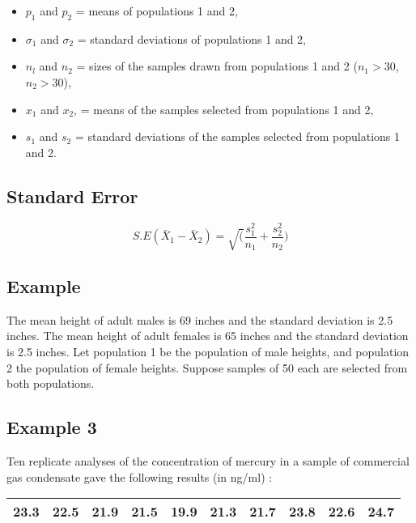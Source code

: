 \documentclass[14pt, a4paper]{article}
\theoremstyle{plain}
\theoremstyle{definition}
\theoremstyle{remark}
\begin{document}
\begin{itemize}
\item $p_1$ and $p_2$ = means of populations 1 and 2,

\item $\sigma_1$ and $\sigma_2$ = standard deviations of
populations 1 and 2,

\item $n_l$ and $n_2$ = sizes of the samples drawn from
populations 1 and 2 ($n_1 >30 $, $n_2 >30 $),

\item $x_1$ and $x_2$, = means of the samples selected from
populations 1 and 2,

\item $s_{1}$ and $s_{2}$ = standard deviations of the samples
selected from populations 1 and 2.

\end{itemize}
\newpage


\subsection{Standard Error}

\begin{equation}
S.E(\bar{X}_{1}-\bar{X}_{2}) =
\sqrt(\frac{s^2_{1}}{n_{1}}+\frac{s^2_{2}}{n_{2}})
\end{equation}

\subsection{Example}
The mean height of adult males is 69 inches and the standard
deviation is 2.5 inches. The mean height of adult females is 65
inches and the standard deviation is 2.5 inches. Let population 1
be the population of male heights, and population 2 the population
of female heights. Suppose samples of 50 each are selected from
both populations.



\subsection{Example 3} Ten replicate analyses of the concentration
of mercury in a sample of commercial gas condensate gave the
following results (in ng/ml) :

\begin{tabular}{|c|c|c|c|c|c|c|c|c|c|}
  \hline
23.3 & 22.5 & 21.9 & 21.5 & 19.9 & 21.3 & 21.7 & 23.8 & 22.6 &
24.7\\
  \hline
\end{tabular}
\end{document}

